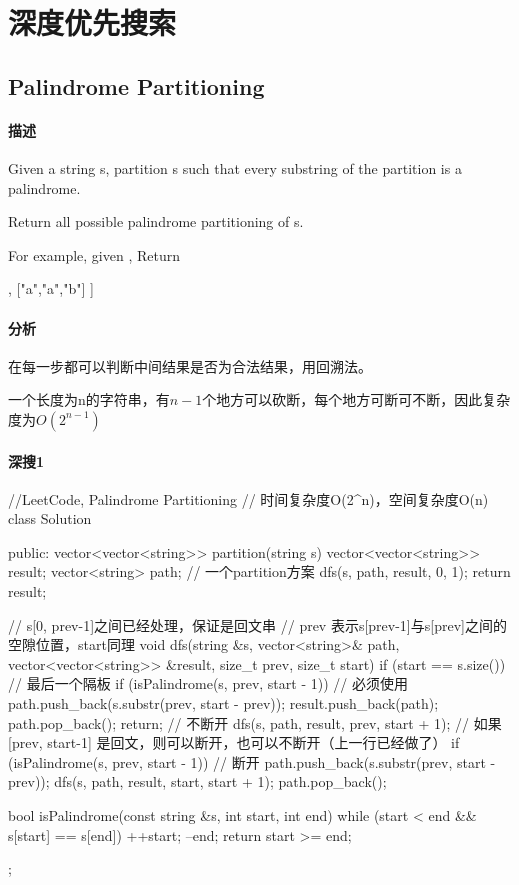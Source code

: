 \chapter{深度优先搜索}


\section{Palindrome Partitioning} %
\label{sec:palindrome-partitioning}


\subsubsection{描述}
Given a string s, partition s such that every substring of the partition is a palindrome.

Return all possible palindrome partitioning of s.

For example, given ,
Return
\begin{Code}
  [
    ["aa","b"],
    ["a","a","b"]
  ]
\end{Code}


\subsubsection{分析}
在每一步都可以判断中间结果是否为合法结果，用回溯法。

一个长度为n的字符串，有$n-1$个地方可以砍断，每个地方可断可不断，因此复杂度为$O(2^{n-1})$


\subsubsection{深搜1}
\begin{Code}
//LeetCode, Palindrome Partitioning
// 时间复杂度O(2^n)，空间复杂度O(n)
class Solution {
public:
    vector<vector<string>> partition(string s) {
        vector<vector<string>> result;
        vector<string> path;  // 一个partition方案
        dfs(s, path, result, 0, 1);
        return result;
    }

    // s[0, prev-1]之间已经处理，保证是回文串
    // prev 表示s[prev-1]与s[prev]之间的空隙位置，start同理
    void dfs(string &s, vector<string>& path,
            vector<vector<string>> &result, size_t prev, size_t start) {
        if (start == s.size()) { // 最后一个隔板
            if (isPalindrome(s, prev, start - 1)) { // 必须使用
                path.push_back(s.substr(prev, start - prev));
                result.push_back(path);
                path.pop_back();
            }
            return;
        }
        // 不断开
        dfs(s, path, result, prev, start + 1);
        // 如果[prev, start-1] 是回文，则可以断开，也可以不断开（上一行已经做了）
        if (isPalindrome(s, prev, start - 1)) {
            // 断开
            path.push_back(s.substr(prev, start - prev));
            dfs(s, path, result, start, start + 1);
            path.pop_back();
        }
    }

    bool isPalindrome(const string &s, int start, int end) {
        while (start < end && s[start] == s[end]) {
            ++start;
            --end;
        }
        return start >= end;
    }
};
\end{Code}


